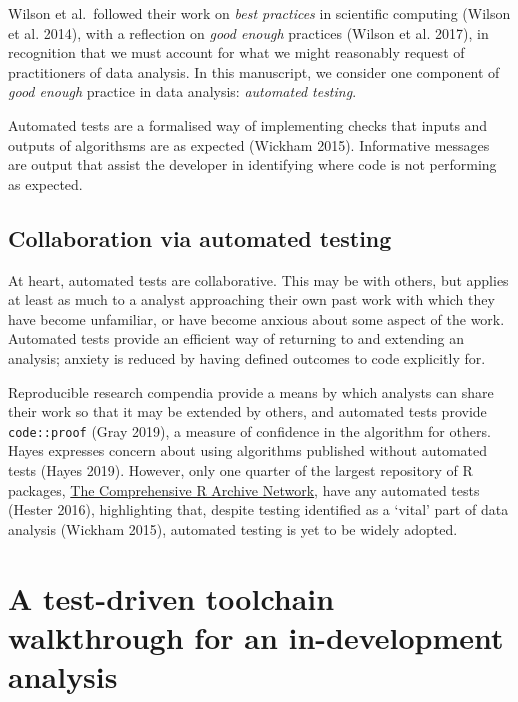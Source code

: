 \documentclass[
]{article}
\begin{document}
Wilson et al.~followed their work on \emph{best practices} in scientific
computing (Wilson et al. 2014), with a reflection on \emph{good enough}
practices (Wilson et al. 2017), in recognition that we must account for
what we might reasonably request of practitioners of data analysis. In
this manuscript, we consider one component of \emph{good enough}
practice in data analysis: \emph{automated testing}.

Automated tests are a formalised way of implementing checks that inputs
and outputs of algorithsms are as expected (Wickham 2015). Informative
messages are output that assist the developer in identifying where code
is not performing as expected.

\hypertarget{collaboration-via-automated-testing}{%
\subsection{Collaboration via automated
testing}\label{collaboration-via-automated-testing}}

At heart, automated tests are collaborative. This may be with others,
but applies at least as much to a analyst approaching their own past
work with which they have become unfamiliar, or have become anxious
about some aspect of the work. Automated tests provide an efficient way
of returning to and extending an analysis; anxiety is reduced by having
defined outcomes to code explicitly for.

Reproducible research compendia provide a means by which analysts can
share their work so that it may be extended by others, and automated
tests provide \texttt{code::proof} (Gray 2019), a measure of confidence
in the algorithm for others. Hayes expresses concern about using
algorithms published without automated tests (Hayes 2019). However, only
one quarter of the largest repository of R packages,
\href{https://cran.r-project.org/}{The Comprehensive R Archive Network},
have any automated tests (Hester 2016), highlighting that, despite
testing identified as a `vital' part of data analysis (Wickham 2015),
automated testing is yet to be widely adopted.

\hypertarget{a-test-driven-toolchain-walkthrough-for-an-in-development-analysis}{%
\section{A test-driven toolchain walkthrough for an in-development
analysis}\label{a-test-driven-toolchain-walkthrough-for-an-in-development-analysis}}
\end{document}

